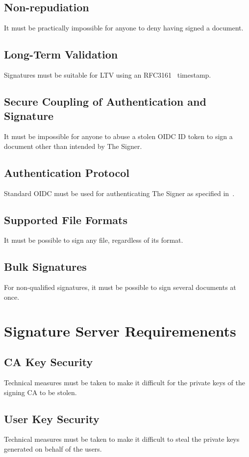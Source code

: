 \subsection{Non-repudiation}
It must be practically impossible for anyone to deny having signed a document.

\subsection{Long-Term Validation}
Signatures must be suitable for \gls{LTV} using an RFC3161~\cite{rfc3161} timestamp.

\subsection{Secure Coupling of Authentication and Signature}
It must be impossible for anyone to abuse a stolen \gls{OIDC} ID token to sign a document other than intended by The Signer.

\subsection{Authentication Protocol}
Standard \gls{OIDC} must be used for authenticating The Signer as specified in~\cite{oidc}.

\subsection{Supported File Formats}
It must be possible to sign any file, regardless of its format.

\subsection{Bulk Signatures}
For non-qualified signatures, it must be possible to sign several documents at once.

\section{Signature Server Requiremenents}
\label{sec:signatureserverrequirements}
\subsection{CA Key Security}
Technical measures must be taken to make it difficult for the private keys of the signing \gls{CA} to be stolen.

\subsection{User Key Security}
Technical measures must be taken to make it difficult to steal the private keys generated on behalf of the users.

